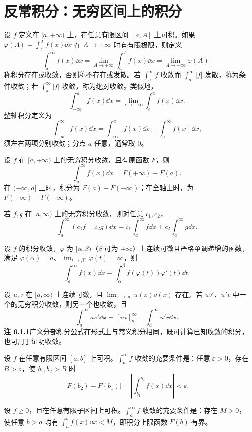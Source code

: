 \clearpage
\section{反常积分：无穷区间上的积分}
设 $f$ 定义在 $[a,+\infty)$ 上，在任意有限区间 $[a,A]$ 上可积。如果 $\varphi(A)=\int_a^Af(x)\dd x$ 在 $A\to+\infty$ 时有有限极限，则定义
\[
\int_a^\infty f(x)\dd x=\lim_{A\to+\infty}\int_a^Af(x)\dd x=\lim_{A\to+\infty}\varphi(A),
\]
称积分存在或收敛，否则称不存在或发散。若 $\int_a^\infty f$ 收敛而 $\int_a^\infty|f|$ 发散，称为条件收敛；若 $\int_a^\infty|f|$ 收敛，称为绝对收敛。类似地，
\[
\int_{-\infty}^af(x)\dd x=\lim_{c\to-\infty}\int_c^af(x)\dd x.
\]
整轴积分定义为
\[
\int_{-\infty}^\infty f(x)\dd x=\int_{-\infty}^af(x)\dd x+\int_a^\infty f(x)\dd x,
\]
须左右两项分别收敛；分点 $a$ 任意，通常取 $0$。

设 $f$ 在 $[a,+\infty)$ 上的无穷积分收敛，且有原函数 $F$，则
\[
\int_a^\infty f(x)\dd x=F(+\infty)-F(a).
\]
在 $(-\infty,a]$ 上时，积分为 $F(a)-F(-\infty)$；在全轴上时，为 $F(+\infty)-F(-\infty)$。

若 $f,g$ 在 $[a,\infty)$ 上的无穷积分收敛，则对任意 $c_1,c_2$，
\[
\int_a^\infty(c_1f+c_2g)\dd x=c_1\int_a^\infty f\dd x+c_2\int_a^\infty g\dd x.
\]

设 $f$ 的积分收敛，$\varphi$ 为 $[\alpha,\beta)$（$\beta$ 可为 $+\infty$）上连续可微且严格单调递增的函数，满足 $\varphi(\alpha)=a$、$\lim_{t\to\beta^-}\varphi(t)=\infty$，则
\[
\int_a^\infty f(x)\dd x=\int_\alpha^\beta f(\varphi(t))\varphi'(t)\dd t.
\]

设 $u,v$ 在 $[a,\infty)$ 上连续可微，且 $\lim_{x\to\infty}u(x)v(x)$ 存在。若 $uv'$、$u'v$ 中一个的无穷积分收敛，则另一个也收敛，且
\[
\int_a^\infty uv'\dd x=[uv]_a^\infty-\int_a^\infty u'v\dd x.
\]
\textbf{注 6.1.1}\quad 广义分部积分公式在形式上与常义积分相同，既可计算已知收敛的积分，也可用于证明收敛。

设 $f$ 在任意有限区间 $[a,b]$ 上可积。$\int_a^\infty f$ 收敛的充要条件是：任意 $\varepsilon>0$，存在 $B>a$，使 $b_1,b_2>B$ 时
\[
|F(b_2)-F(b_1)|=\left|\int_{b_1}^{b_2}f(x)\dd x\right|<\varepsilon.
\]

设 $f\ge0$，且在任意有限子区间上可积。$\int_a^\infty f$ 收敛的充要条件是：存在 $M>0$，使任意 $b>a$ 均有 $\int_a^bf(x)\dd x<M$，即积分上限函数 $F(b)$ 有界。

